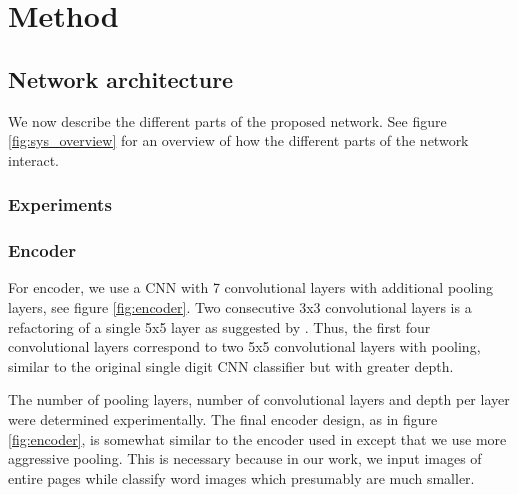 \section{Method}

\subsection{Network architecture}



We now describe the different parts of the proposed network. See figure \ref{fig:sys_overview} for an overview of how the different parts of the network interact.

\subsubsection{Experiments}

\subsubsection{Encoder}



For encoder, we use a CNN with 7 convolutional layers with additional pooling layers, see figure \ref{fig:encoder}.
Two consecutive 3x3 convolutional layers is a refactoring of a single 5x5 layer as suggested by \cite{InceptionV3}. Thus, the first four convolutional layers correspond to two 5x5 convolutional layers with pooling, similar to the original single digit CNN classifier \cite{lecun_1989} but with greater depth.

The number of pooling layers, number of convolutional layers and depth per layer were determined experimentally. The final encoder design, as in figure \ref{fig:encoder}, is somewhat similar to the encoder used in \cite{FornesCnnCategorization} except that we use more aggressive pooling. This is necessary because in our work, we input images of entire pages while \cite{FornesCnnCategorization} classify word images which presumably are much smaller.



